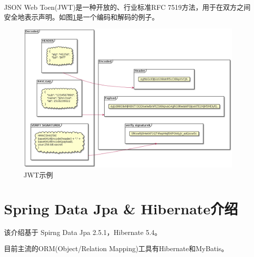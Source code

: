 JSON Web Toen(JWT)是一种开放的、行业标准RFC 7519方法，用于在双方之间安全地表示声明。如图\ref{jwt}是一个编码和解码的例子。
\begin{figure}[htbp]
  \centering
  \includegraphics[scale = 0.4]{out/uml/部署图/JWT/JWT.png}
  \caption{\song\wuhao JWT示例}
  \label{jwt}
\end{figure}

\section{Spring Data Jpa \& Hibernate介绍}

该介绍基于 Spirng Data Jpa 2.5.1，Hibernate 5.4。

目前主流的ORM(Object/Relation Mapping)工具有Hibernate和MyBatis。

